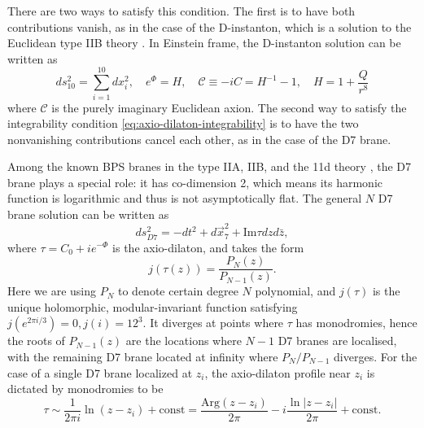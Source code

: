 {\color{orange}
There are two ways to satisfy this condition. 
The first is to have both contributions vanish, as in the case of the D-instanton, which is a solution to the Euclidean type IIB theory \cite{Gibbons:1995vg}.
In Einstein frame, the D-instanton solution can be written as
\begin{equation}
ds_{10}^2 = \sum_{i=1}^{10} dx_i^2,\quad
e^\Phi = H, \quad\mathcal C\equiv-iC = H^{-1}-1,\quad
H=1+\frac{Q}{r^8}
\end{equation}
where $\mathcal{C}$ is the purely imaginary Euclidean axion.
The second way to satisfy the integrability condition \eqref{eq:axio-dilaton-integrability} is to have the two nonvanishing contributions cancel each other, as in the case of the D7 brane.

Among the known BPS branes in the type IIA, IIB, and the 11d theory \cite{Stelle:1998xg}, the D7 brane plays a special role: it has co-dimension 2, which means its harmonic function is logarithmic and thus is not asymptotically flat.
The general $N$ D7 brane solution can be written as \cite{Greene:1989ya,Gibbons:1995vg,Tseytlin:1996ne,Bergshoeff:2006jj}
\begin{equation}
ds_{D7}^2 = -dt^2 + d\vec{x}_7^2 + \text{Im} \tau dz d\bar z,
\end{equation}
where $\tau = C_0 + i e^{-\Phi}$ is the axio-dilaton, and takes the form
\begin{equation}
j(\tau(z)) = \frac{P_N(z)}{P_{N-1}(z)}.
\end{equation}
Here we are using $P_N$ to denote certain degree $N$ polynomial, and $j(\tau)$ is the unique holomorphic, modular-invariant function satisfying $j(e^{2\pi i /3}) = 0, j(i) = 12^3$. It diverges at points where $\tau$ has monodromies, hence the roots of $P_{N-1}(z)$ are the locations where $N-1$ D7 branes are localised, with the remaining D7 brane located at infinity where $P_N / P_{N-1}$ diverges.
For the case of a single D7 brane localized at $z_i$, the axio-dilaton profile near $z_i$ is dictated by monodromies to be
\begin{equation}
\tau \sim \frac{1}{2\pi i}\ln (z-z_i)+\text{const}
 = \frac{\text{Arg}(z-z_i)}{2\pi} -i\frac{\ln |z-z_i|}{2\pi}+\text{const}.
 \label{D7 axio-dilaton profile}
\end{equation}
}


